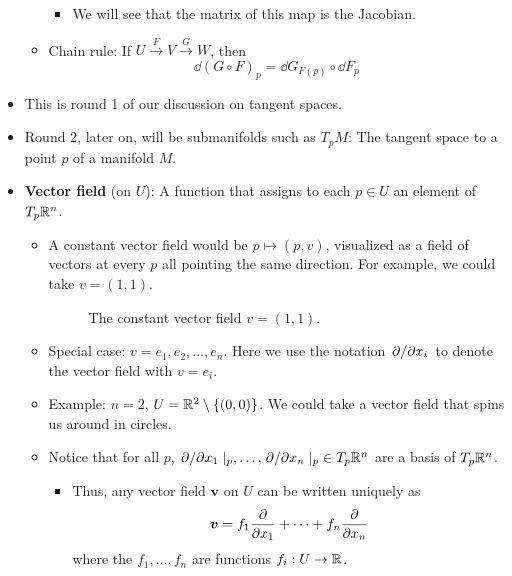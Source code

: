 \documentclass[../notes.tex]{subfiles}
\begin{document}
\begin{itemize}
\begin{itemize}
        \begin{itemize}
            \item We will see that the matrix of this map is the Jacobian.
        \end{itemize}
        \item Chain rule: If $U\xrightarrow{F}V\xrightarrow{G}W$, then
        \begin{equation*}
            \dd{(G\circ F)_p} = \dd{G}_{F(p)}\circ\dd{F_p}
        \end{equation*}
    \end{itemize}
    \item This is round 1 of our discussion on tangent spaces.
    \item Round 2, later on, will be submanifolds such as $T_pM$: The tangent space to a point $p$ of a manifold $M$.
    \item \textbf{Vector field} (on $U$): A function that assigns to each $p\in U$ an element of $T_p\mathbb{R}^n$.
    \begin{itemize}
        \item A constant vector field would be $p\mapsto(p,v)$, visualized as a field of vectors at every $p$ all pointing the same direction. For example, we could take $v=(1,1)$.
        \begin{figure}[h!]
            \centering
            \caption{The constant vector field $v=(1,1)$.}
            \label{fig:constantVectorField}
        \end{figure}
        \item Special case: $v=e_1,e_2,\dots,e_n$. Here we use the notation $\pdv*{x_i}$ to denote the vector field with $v=e_i$.
        \item Example: $n=2$, $U=\mathbb{R}^2\setminus\{(0,0)\}$. We could take a vector field that spins us around in circles.
        \item Notice that for all $p$, $\pdv*{x_1}|_p,\dots,\pdv*{x_n}|_p\in T_p\mathbb{R}^n$ are a basis of $T_p\mathbb{R}^n$.
        \begin{itemize}
            \item Thus, any vector field $\bm{v}$ on $U$ can be written uniquely as
            \begin{equation*}
                \bm{v} = f_1\pdv{x_1}+\cdots+f_n\pdv{x_n}
            \end{equation*}
            where the $f_1,\dots,f_n$ are functions $f_i:U\to\mathbb{R}$.
        \end{itemize}
    \end{itemize}
\end{itemize}
\end{document}

